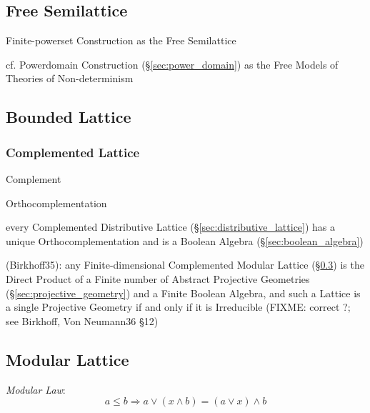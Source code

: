 \subsection{Free Semilattice}\label{sec:free_semilattice}

Finite-powerset Construction as the Free Semilattice %

cf. Powerdomain Construction (\S\ref{sec:power_domain}) as the Free
Models of Theories of Non-determinism



\subsection{Bounded Lattice}\label{sec:bounded_lattice}

\subsubsection{Complemented Lattice}\label{sec:complemented_lattice}

Complement

Orthocomplementation

every Complemented Distributive Lattice (\S\ref{sec:distributive_lattice}) has a
unique Orthocomplementation and is a Boolean Algebra
(\S\ref{sec:boolean_algebra})

(Birkhoff35): any Finite-dimensional Complemented Modular Lattice
(\S\ref{sec:modular_lattice}) is the Direct Product of a Finite number of
Abstract Projective Geometries (\S\ref{sec:projective_geometry}) and a Finite
Boolean Algebra, and such a
Lattice is a single Projective Geometry if and only if it is Irreducible
(FIXME: correct ?; see Birkhoff, Von Neumann36 \S 12)



\subsection{Modular Lattice}\label{sec:modular_lattice}

\emph{Modular Law}:
\[
  a \leq b \Rightarrow a \vee (x \wedge b) = (a \vee x) \wedge b
\]


